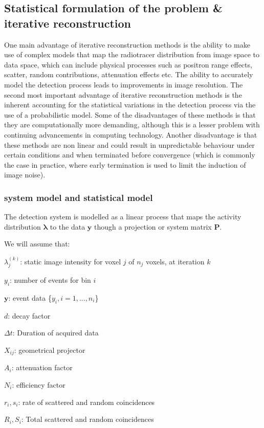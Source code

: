 \subsection{Statistical formulation of the problem \& iterative reconstruction}
One main advantage of iterative reconstruction methods is the ability to make use of complex models that map the radiotracer distribution from image space to data space, which can include physical processes such as positron range effects, scatter, random contributions, attenuation effects etc. The ability to accurately model the detection process leads to improvements in image resolution. The second most important advantage of iterative reconstruction methods is the inherent accounting for the statistical variations in the detection process via the use of a probabilistic model. Some of the disadvantages of these methods is that they are computationally more demanding, although this is a lesser problem with continuing advancements in computing technology. Another disadvantage is that these methods are non linear and could result in unpredictable behaviour under certain conditions and when terminated before convergence (which is commonly the case in practice, where early termination is used to limit the induction of image noise). 

\subsubsection{system model and statistical model}
The detection system is modelled as a linear process that maps the activity distribution $\bm\lambda$ to the data $\bm{y}$ though a projection or system matrix $\bm{P}$. 

We will assume that: 
\begin{itemize}
\begin{small}
\item $\lambda_j^{(k)}$: static image intensity for voxel $j$ of $n_j$ voxels, at iteration $k$
\item $y_i$: number of events for bin $i$
\item $\bm{y}$: event data \{$y_i, i=1,...,n_i$\}
\item $d $: decay factor
\item $\Delta t$: Duration of acquired data
\item $X_{ij}$: geometrical projector 
\item $ A_i$: attenuation factor
\item $N_i$: efficiency factor
\item $r_i, s_i$: rate of scattered and random coincidences
\item $R_i, S_i$: Total scattered and random coincidences
\end{small}
\end{itemize}

